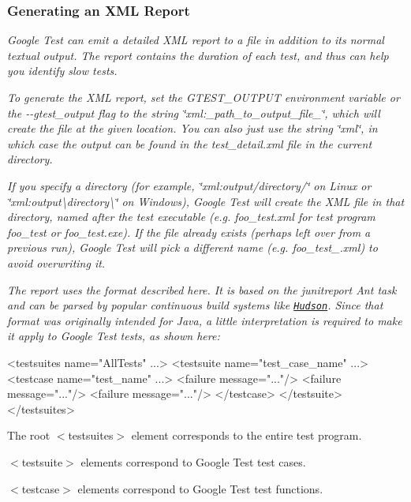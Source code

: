 {\itshape \subsubsection*{Generating an X\+ML Report}}

{\itshape }

{\itshape Google Test can emit a detailed X\+ML report to a file in addition to its normal textual output. The report contains the duration of each test, and thus can help you identify slow tests.}

{\itshape To generate the X\+ML report, set the {\ttfamily G\+T\+E\+S\+T\+\_\+\+O\+U\+T\+P\+UT} environment variable or the {\ttfamily -\/-\/gtest\+\_\+output} flag to the string {\ttfamily \char`\"{}xml\+:\+\_\+path\+\_\+to\+\_\+output\+\_\+file\+\_\+\char`\"{}}, which will create the file at the given location. You can also just use the string {\ttfamily \char`\"{}xml\char`\"{}}, in which case the output can be found in the {\ttfamily test\+\_\+detail.\+xml} file in the current directory.}

{\itshape If you specify a directory (for example, {\ttfamily \char`\"{}xml\+:output/directory/\char`\"{}} on Linux or {\ttfamily \char`\"{}xml\+:output\textbackslash{}directory\textbackslash{}\char`\"{}} on Windows), Google Test will create the X\+ML file in that directory, named after the test executable (e.\+g. {\ttfamily foo\+\_\+test.\+xml} for test program {\ttfamily foo\+\_\+test} or {\ttfamily foo\+\_\+test.\+exe}). If the file already exists (perhaps left over from a previous run), Google Test will pick a different name (e.\+g. {\ttfamily foo\+\_\+test\+\_.\+xml}) to avoid overwriting it.}

{\itshape The report uses the format described here. It is based on the {\ttfamily junitreport} Ant task and can be parsed by popular continuous build systems like \href{https://hudson.dev.java.net/}{\tt Hudson}. Since that format was originally intended for Java, a little interpretation is required to make it apply to Google Test tests, as shown here\+:}

{\itshape 
\begin{DoxyCode}
<testsuites name="AllTests" ...>
  <testsuite name="test\_case\_name" ...>
    <testcase name="test\_name" ...>
      <failure message="..."/>
      <failure message="..."/>
      <failure message="..."/>
    </testcase>
  </testsuite>
</testsuites>
\end{DoxyCode}
}

{\itshape 
\begin{DoxyItemize}
\item The root {\ttfamily $<$testsuites$>$} element corresponds to the entire test program.
\item {\ttfamily $<$testsuite$>$} elements correspond to Google Test test cases.
\item {\ttfamily $<$testcase$>$} elements correspond to Google Test test functions.
\end{DoxyItemize}}

